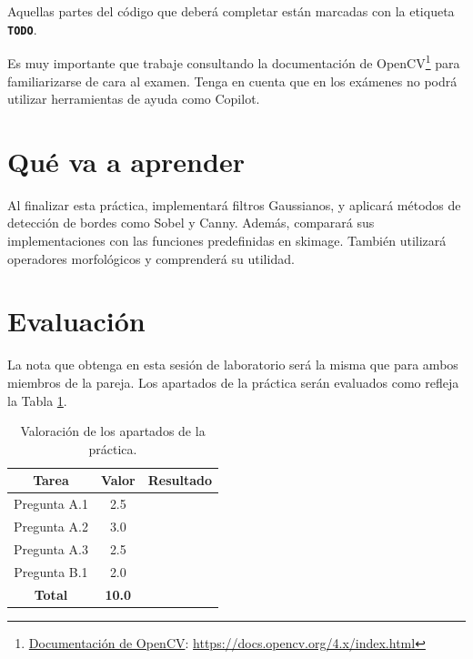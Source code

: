 Aquellas partes del código que deberá completar están marcadas con la etiqueta \textbf{\texttt{TODO}}.

Es muy importante que trabaje consultando la documentación de OpenCV\footnote{\href{https://docs.opencv.org/4.x/index.html}{Documentación de OpenCV}: \url{https://docs.opencv.org/4.x/index.html}} para familiarizarse de cara al examen. Tenga en cuenta que en los exámenes no podrá utilizar herramientas de ayuda como Copilot.

\section{Qué va a aprender}

Al finalizar esta práctica, implementará filtros Gaussianos, y aplicará métodos de detección de bordes como Sobel y Canny. Además, comparará sus implementaciones con las funciones predefinidas en skimage. También utilizará operadores morfológicos y comprenderá su utilidad.

\section{Evaluación}

La nota que obtenga en esta sesión de laboratorio será la misma que para ambos miembros de la pareja. Los apartados de la práctica serán evaluados como refleja la Tabla \ref{table:evaluacion}.

\begin{table}[h!]
    \centering
    \begin{tabular}{|c|c|c|}
    \hline
    \textbf{Tarea} & \textbf{Valor} & \textbf{Resultado} \\
    \hline
    Pregunta A.1 & 2.5 & \\
    \hline
    Pregunta A.2 & 3.0 & \\
    \hline
    Pregunta A.3 & 2.5 & \\
    \hline
    Pregunta B.1 & 2.0 & \\
    \hline
    \textbf{Total} & \textbf{10.0} & \\
    \hline
    \end{tabular}
    \caption{Valoración de los apartados de la práctica.}
    \label{table:evaluacion}
\end{table}
